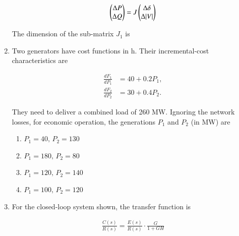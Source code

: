 \documentclass[journal,12pt,onecolumn]{IEEEtran}
\theoremstyle{remark}
\begin{document}
\begin{flushleft}
\begin{enumerate}
\[
\begin{pmatrix}
\Delta P \\ \Delta Q
\end{pmatrix}
=
J \begin{pmatrix}
\Delta \delta \\ \Delta |V|
\end{pmatrix}
\]

The dimension of the sub-matrix $J_1$ is

\begin{enumerate}
\end{enumerate}


\item Two generators have cost functions in  h. Their incremental-cost characteristics are  

\begin{align*}
\frac{dF_1}{dP_1} &= 40 + 0.2 P_1, \\
\frac{dF_2}{dP_2} &= 30 + 0.4 P_2.
\end{align*}

They need to deliver a combined load of 260 MW. Ignoring the network losses, for economic operation, the generations $P_1$ and $P_2$ (in MW) are

\begin{enumerate}
\item $P_1 = 40, \, P_2 = 130$
\item $P_1 = 180, \, P_2 = 80$
\item $P_1 = 120, \, P_2 = 140$
\item $P_1 = 100, \, P_2 = 120$
\end{enumerate}

\item For the closed-loop system shown, the transfer function is  

\begin{align*}
    \frac{C(s)}{R(s)} = \frac{E(s)}{R(s)} \cdot \frac{G}{1+GH}
\end{align*}


\end{enumerate}
\end{flushleft}
\end{document}
